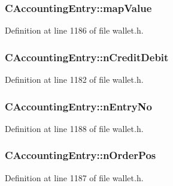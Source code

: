 \subsubsection[{map\+Value}]{ C\+Accounting\+Entry\+::map\+Value}\label{class_c_accounting_entry_a5e3f28cdc5d1fb25472c49c482613fcb}


Definition at line 1186 of file wallet.\+h.

\hypertarget{class_c_accounting_entry_a3a0377685a688c97af2e40581e919b0f}{}
\subsubsection[{n\+Credit\+Debit}]{ C\+Accounting\+Entry\+::n\+Credit\+Debit}\label{class_c_accounting_entry_a3a0377685a688c97af2e40581e919b0f}


Definition at line 1182 of file wallet.\+h.

\hypertarget{class_c_accounting_entry_a0c35da8adbbc529238af70964e0d2b29}{}
\subsubsection[{n\+Entry\+No}]{ C\+Accounting\+Entry\+::n\+Entry\+No}\label{class_c_accounting_entry_a0c35da8adbbc529238af70964e0d2b29}


Definition at line 1188 of file wallet.\+h.

\hypertarget{class_c_accounting_entry_a9c5f78f13a657c1f1fc860a70ef072d5}{}
\subsubsection[{n\+Order\+Pos}]{ C\+Accounting\+Entry\+::n\+Order\+Pos}\label{class_c_accounting_entry_a9c5f78f13a657c1f1fc860a70ef072d5}


Definition at line 1187 of file wallet.\+h.

